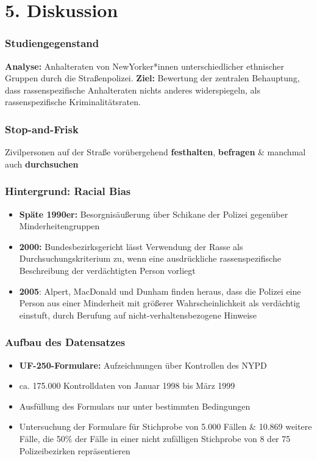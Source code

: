 \documentclass{beamer}
\begin{document}
	\section{5. Diskussion}
	\begin{frame}
		\frametitle{Studiengegenstand}
		\textbf{Analyse:} Anhalteraten von NewYorker*innen unterschiedlicher ethnischer Gruppen durch die Straßenpolizei.\newline
		\newline
		\textbf{Ziel:} Bewertung der zentralen Behauptung, dass rassenspezifische Anhalteraten nichts anderes widerspiegeln, als rassenspezifische Kriminalitätsraten.
	\end{frame}
	\begin{frame}
		\frametitle{Stop-and-Frisk}
		\begin{definition}
			Zivilpersonen auf der Straße vorübergehend \textbf{festhalten}, \textbf{befragen} \& manchmal auch \textbf{durchsuchen}
		\end{definition}
	\end{frame}
	\begin{frame}
		\frametitle{Hintergrund: Racial Bias}
		\begin{itemize}
			\item[\textbullet] \textbf{Späte 1990er:} Besorgnisäußerung über Schikane der Polizei gegenüber Minderheitengruppen
			\item[\textbullet] \textbf{2000:} Bundesbezirksgericht lässt Verwendung der Rasse als Durchsuchungskriterium zu, wenn eine ausdrückliche rassenspezifische Beschreibung der verdächtigten Person vorliegt
			\item[\textbullet] \textbf{2005}: Alpert, MacDonald und Dunham finden heraus, dass die Polizei eine Person aus einer Minderheit mit größerer Wahrscheinlichkeit als verdächtig einstuft, durch Berufung auf nicht-verhaltensbezogene Hinweise
		\end{itemize}
	\end{frame}
	\begin{frame}
		\frametitle{Aufbau des Datensatzes}
		\begin{itemize}
			\item[\textbullet] \textbf{UF-250-Formulare:} Aufzeichnungen über Kontrollen des NYPD
			\item[\textbullet] ca. 175.000 Kontrolldaten von Januar 1998 bis März 1999
			\item[\textbullet] Ausfüllung des Formulars nur unter bestimmten Bedingungen
			\item[\textbullet] Untersuchung der Formulare für Stichprobe von 5.000 Fällen \& 10.869 weitere Fälle, die 50\% der Fälle in einer nicht zufälligen Stichprobe von 8 der 75 Polizeibezirken repräsentieren
		\end{itemize}
	\end{frame}
\end{document}
